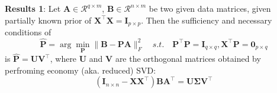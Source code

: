 \documentclass[titlepage,11pt,twoside]{article}
\begin{document}
\textbf{Results 1}: Let $\mathbf{A}\in \mathcal{R}^{q\times m}$, $\mathbf{B}\in \mathcal{R}^{n\times m}$ be two given data matrices, given partially known prior of $\mathbf{X}^{\top}\mathbf{X}=\mathbf{I}_{p\times p}$. Then the sufficiency and necessary conditions of
\begin{equation}
\mathbf{\hat{P}}=\arg\min_{\mathbf{P}}\|\mathbf{B}-\mathbf{P}\mathbf{A}\|_{F}^{2}
\quad
s.t.
\quad
\mathbf{P}^{\top}\mathbf{P} = \mathbf{I}_{q\times q}, \mathbf{X}^{\top}\mathbf{P} = \mathbf{0}_{p\times q} 
\end{equation}
is $\mathbf{\hat{P}} = \mathbf{U}\mathbf{V}^{\top}$, where $\mathbf{U}$ and $\mathbf{V}$ are the orthogonal matrices obtained by perfroming economy (aka. reduced) SVD:
\begin{equation}
(\mathbf{I}_{n\times n}-\mathbf{X}\mathbf{X}^{\top})\mathbf{B}\mathbf{A}^{\top} = \mathbf{U}\mathbf{\Sigma}\mathbf{V}^{\top}
\end{equation}
\end{document}
